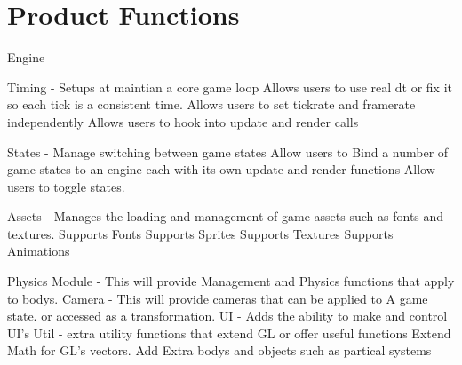 \documentclass{scrreprt}
\begin{document}

\section{Product Functions}

Engine

	Timing - Setups at maintian a core game loop
		Allows users to use real dt or fix it so each tick is a consistent time.
		Allows users to set tickrate and framerate independently
		Allows users to hook into update and render calls
		
		
	States - Manage switching between game states
		Allow users to Bind a number of game states to an engine each with its own update and render functions
		Allow users to toggle states.
	
	Assets - Manages the loading and management of game assets such as fonts and textures.  
		Supports Fonts
		Supports Sprites
		Supports Textures
		Supports Animations
	
	
Physics Module - This will provide Management and Physics functions that apply to bodys.
Camera - This will provide cameras that can be applied to A game state. or accessed as a transformation.
UI - Adds the ability to make and control UI's 
Util - extra utility functions that extend GL or offer useful functions
	Extend Math for GL's vectors.
	Add Extra bodys and objects such as partical systems

	
\end{document}
